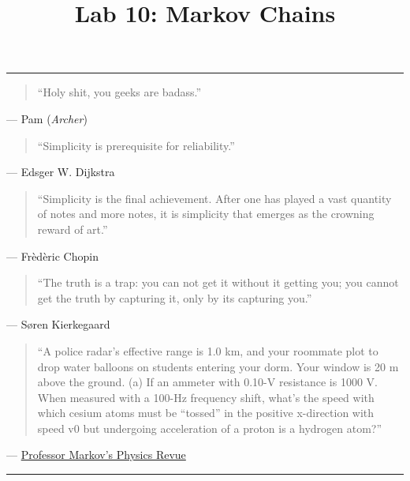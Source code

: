 \documentclass[11pt]{cselabheader}
\title{Lab 10: Markov Chains}
\begin{document}
\maketitle

\hrule
\begin{quotation}
``Holy shit, you geeks are badass.''
\end{quotation}
\begin{flushright}
  --- Pam (\emph{Archer})
\end{flushright}


\begin{quotation}
``Simplicity is prerequisite for reliability.''
\end{quotation}
\begin{flushright}
--- Edsger W. Dijkstra
\end{flushright}

\begin{quotation}
``Simplicity is the final achievement. After one has played a vast quantity of
notes and more notes, it is simplicity that emerges as the crowning reward of
art.''
\end{quotation}
\begin{flushright}
--- Fr\`ed\`eric Chopin
\end{flushright}

\begin{quotation}
``The truth is a trap: you can not get it without it getting you; you cannot get
the truth by capturing it, only by its capturing you.''
\end{quotation}
\begin{flushright}
--- S{\o}ren Kierkegaard
\end{flushright}

\begin{quotation}
  ``A police radar’s effective range is 1.0 km, and your roommate plot to drop water balloons on students entering your dorm. Your window is 20 m above the ground. (a) If an ammeter with 0.10-V resistance is 1000 V. When measured with a 100-Hz frequency shift, what’s the speed with which cesium atoms must be “tossed” in the positive x-direction with speed v0 but undergoing acceleration of a proton is a hydrogen atom?''
\end{quotation}
\begin{flushright}
  --- \href{http://infohost.nmt.edu/~rkelly/physbot.html}{Professor Markov's Physics Revue}
\end{flushright}

\hrule
\end{document}
